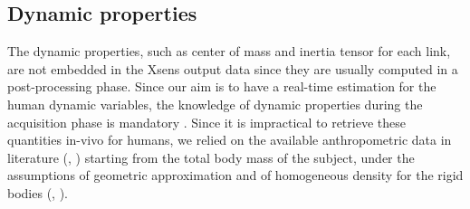 %
%
\subsection{Dynamic properties}
The dynamic properties, such as center of mass and inertia tensor for each link, are not
 embedded in the Xsens output data since they are usually computed in a post-processing phase.
   Since our aim is to have a real-time estimation for the human dynamic variables,
    the knowledge of
    dynamic properties during the acquisition phase is mandatory \cite{Drillis1964}.  Since it is impractical to retrieve these quantities in-vivo for humans, we relied on the
	 available anthropometric data in literature (\cite{Winter1990}, \cite{Herman2007})
	  starting from the total body mass of the
 subject, under the assumptions of geometric approximation and of homogeneous density for
  the rigid bodies (\cite{Hanavan1964}, \cite{Yeadon1990}).  
%
